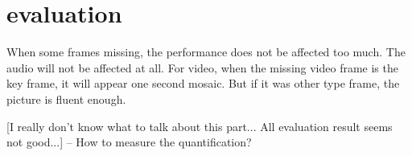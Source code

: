 \section{evaluation} %
\label{sec:evaluation}
When some frames missing, the performance does not be affected too much. The audio will not be affected at all. For video, when the missing video frame is the key frame, it will appear one second mosaic. But if it was other type frame, the picture is fluent enough.

[I really don't know what to talk about this part... All evaluation result seems not good...] -- How to measure the quantification?


